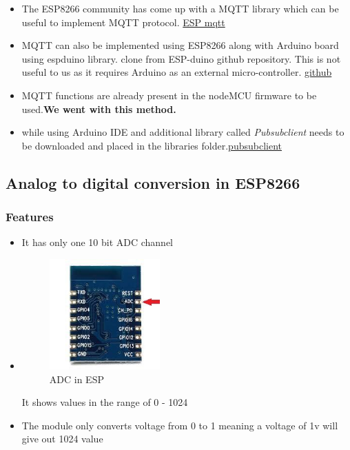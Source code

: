 \documentclass[16pt]{article}
\begin{document}
\begin{itemize}

\item
  The ESP8266 community has come up with a MQTT library which can be
  useful to implement MQTT protocol. \href{https://github.com/tuanpmt/esp_mqtt}{ESP mqtt}
 
\item
  MQTT can also be implemented using ESP8266 along with Arduino board
  using espduino library. clone from ESP-duino github repository. This is not
  useful to us as it requires Arduino as an external micro-controller. \href{https://github.com/tuanpmt/espduino}{github}
\item
  MQTT functions are already present in the nodeMCU firmware to be used.\textbf{We went with this method.}
\item
  while using Arduino IDE and additional library called
  \emph{Pubsubclient} needs to be downloaded and placed in the libraries
  folder.\href{https://github.com/Imroy/pubsubclient}{pubsubclient}
\end{itemize}



\subsection{Analog to digital conversion in
ESP8266}

\subsubsection{Features}
\begin{itemize}
\item
  It has only one 10 bit ADC channel
\item

\begin{figure}
\hspace{3cm}
\includegraphics[width=0.4\textwidth]{images/ADC.jpeg}
\caption{ADC in ESP}
\end{figure}
  It shows values in the range of 0 - 1024
\item
  The module only converts voltage from 0 to 1 meaning a voltage of 1v
  will give out 1024 value
\end{itemize}
\end{document}
